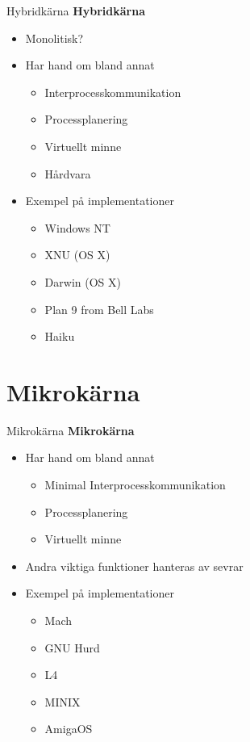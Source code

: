 \documentclass[compress, final]{beamer}
\begin{document}
\begin{frame}{Hybridkärna}
  \textbf{Hybridkärna}
  \begin{itemize}
    \item Monolitisk?
    \item Har hand om bland annat
    \begin{itemize}
      \item Interprocesskommunikation
      \item Processplanering
      \item Virtuellt minne
      \item Hårdvara
    \end{itemize}
    \item Exempel på implementationer
    \begin{itemize}
      \item Windows NT
      \item XNU (OS X)
      \item Darwin (OS X)
      \item Plan 9 from Bell Labs
      \item Haiku
    \end{itemize}
  \end{itemize}
\end{frame}


\section{Mikrokärna}

\begin{frame}{Mikrokärna}
  \textbf{Mikrokärna}
  \begin{itemize}
    \item Har hand om bland annat
    \begin{itemize}
      \item Minimal Interprocesskommunikation
      \item Processplanering
      \item Virtuellt minne
    \end{itemize}
    \item Andra viktiga funktioner hanteras av sevrar
    \item Exempel på implementationer
    \begin{itemize}
      \item Mach
      \item GNU Hurd
      \item L4
      \item MINIX
      \item AmigaOS
    \end{itemize}
  \end{itemize}
\end{frame}
\end{document}
